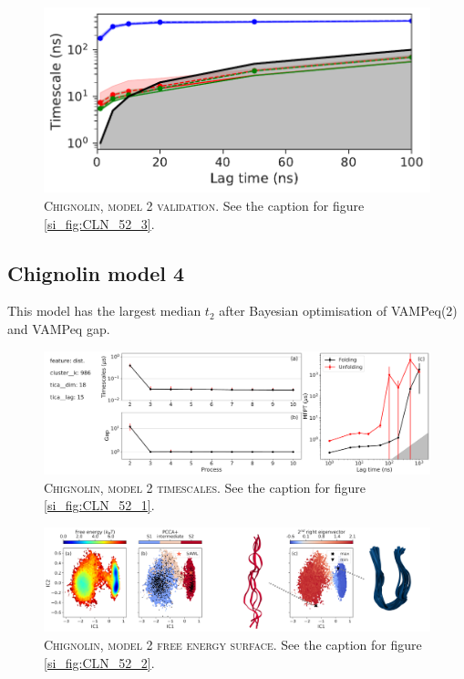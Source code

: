 \documentclass{article}
\begin{document}
\begin{figure}[h]
    \centering
    \includegraphics[height=0.15\textheight]{SI_figures/CLN_218_its.pdf}
    \caption{\textsc{Chignolin, model 2 validation}. See the caption for figure \ref{si_fig:CLN_52_3}.}
    \label{si_fig:CLN_218_3}
\end{figure}

\subsection{Chignolin model 4}

This model has the largest median $t_{2}$ after Bayesian optimisation of VAMPeq(2) and VAMPeq gap.

\begin{figure}[h]
    \centering
    \includegraphics[width=\columnwidth]{SI_figures/CLN_93_SI1.pdf}
    \caption{\textsc{Chignolin,  model 2 timescales}.  See the caption for figure \ref{si_fig:CLN_52_1}. }
    \label{si_fig:CLN_93_1}
\end{figure}

\begin{figure}[h]
    \centering
    \includegraphics[width=\columnwidth]{SI_figures/CLN_93_SI2.png}
    \caption{\textsc{Chignolin,  model 2 free energy surface}. See the caption for figure \ref{si_fig:CLN_52_2}.}
    \label{si_fig:CLN_93_2}
\end{figure}
\end{document}
